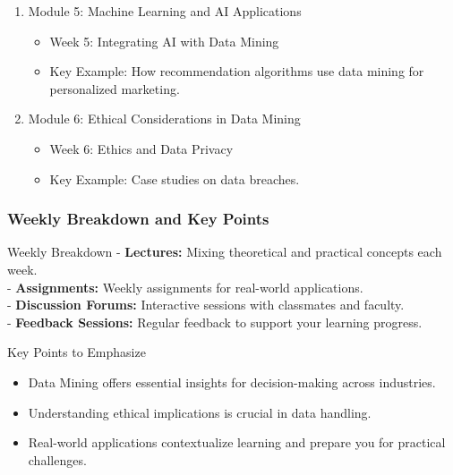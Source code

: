 \documentclass[aspectratio=169]{beamer}
\begin{document}
\begin{frame}[fragile]
\begin{enumerate}
        \item Module 5: Machine Learning and AI Applications
        \begin{itemize}
            \item Week 5: Integrating AI with Data Mining
            \item Key Example: How recommendation algorithms use data mining for personalized marketing.
        \end{itemize}
        
        \item Module 6: Ethical Considerations in Data Mining
        \begin{itemize}
            \item Week 6: Ethics and Data Privacy
            \item Key Example: Case studies on data breaches.
        \end{itemize}
    \end{enumerate}
\end{frame}

\begin{frame}[fragile]
    \frametitle{Weekly Breakdown and Key Points}
    \begin{block}{Weekly Breakdown}
        - \textbf{Lectures:} Mixing theoretical and practical concepts each week. \\
        - \textbf{Assignments:} Weekly assignments for real-world applications. \\
        - \textbf{Discussion Forums:} Interactive sessions with classmates and faculty. \\
        - \textbf{Feedback Sessions:} Regular feedback to support your learning progress.
    \end{block}

    \begin{block}{Key Points to Emphasize}
        \begin{itemize}
            \item Data Mining offers essential insights for decision-making across industries.
            \item Understanding ethical implications is crucial in data handling.
            \item Real-world applications contextualize learning and prepare you for practical challenges.
        \end{itemize}
    \end{block}
\end{frame}
\end{document}
